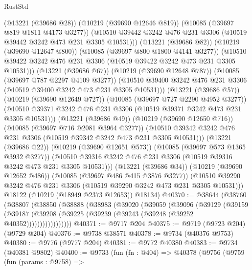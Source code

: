 \begin{lexlean}{RustStd}
\begin{coremodule}
                    (@13221 (@39686 @28))
                    (@10219 (@39690 @12646 @819))
                    (@10085 (@39697 @819 @1811 @4173 @3277))
                    (@10510
                      @39442
                      @3242
                      @476
                      @231
                      @3306
                      (@10519 @39442 @3242 @473 @231 @3305 @10531)))
                  (@13221 (@39686 @82))
                  (@10219 (@39690 @12647 @800))
                  (@10085 (@39697 @800 @1800 @4141 @3277))
                  (@10510
                    @39422
                    @3242
                    @476
                    @231
                    @3306
                    (@10519 @39422 @3242 @473 @231 @3305 @10531)))
                (@13221 (@39686 @67))
                (@10219 (@39690 @12648 @787))
                (@10085 (@39697 @787 @2297 @4109 @3277))
                (@10510 @39400 @3242 @476 @231 @3306 (@10519 @39400 @3242 @473 @231 @3305 @10531)))
              (@13221 (@39686 @57))
              (@10219 (@39690 @12649 @727))
              (@10085 (@39697 @727 @2290 @4952 @3277))
              (@10510 @39371 @3242 @476 @231 @3306 (@10519 @39371 @3242 @473 @231 @3305 @10531)))
            (@13221 (@39686 @49))
            (@10219 (@39690 @12650 @716))
            (@10085 (@39697 @716 @2081 @3964 @3277))
            (@10510 @39342 @3242 @476 @231 @3306 (@10519 @39342 @3242 @473 @231 @3305 @10531)))
          (@13221 (@39686 @22))
          (@10219 (@39690 @12651 @573))
          (@10085 (@39697 @573 @1365 @3932 @3277))
          (@10510 @39316 @3242 @476 @231 @3306 (@10519 @39316 @3242 @473 @231 @3305 @10531)))
        (@13221 (@39686 @34))
        (@10219 (@39690 @12652 @486))
        (@10085 (@39697 @486 @415 @3876 @3277))
        (@10510 @39290 @3242 @476 @231 @3306 (@10519 @39290 @3242 @473 @231 @3305 @10531)))
      @18122
      (@10219 (@18949 @2373 @12653))
      @18134)
@40370 := @38644
    (@38760
      (@38807
        (@38850
          (@38888
            (@38983
              (@39020
                (@39059
                  (@39096
                    (@39129
                      (@39159
                        (@39187
                          (@39208 (@39225 (@39239 (@39243 (@39248 (@39252 @40352)))))))))))))))))
@40371 := @9717 @204
@40375 := @9719 (@9723 @204) (@9729 @204)
@40376 := @9738 @38571
@40378 := @9734 (@40376 @9753)
@40380 := @9776 (@9777 @204)
@40381 := @9772 @40380
@40383 := @9734 (@40381 @9802)
@40400 := @9733
    (fun (fn : @404) =>
    @40378
      (@9756
        (@9759
          (fun (params : @9758) =>

\end{coremodule}
\end{lexlean}
